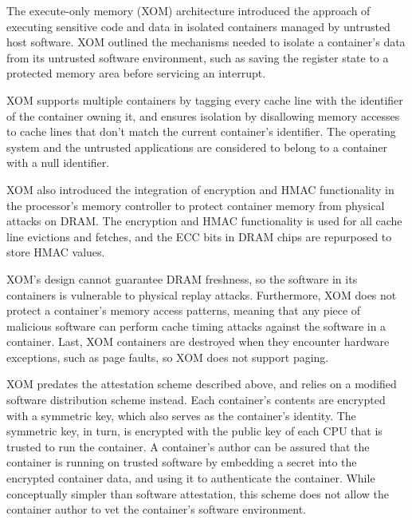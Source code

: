 \label{sec:sgx_related_xom}

The execute-only memory (XOM) architecture \cite{lie2000xom} introduced the
approach of executing sensitive code and data in isolated containers managed by
untrusted host software. XOM outlined the mechanisms needed to isolate a
container's data from its untrusted software environment, such as saving the
register state to a protected memory area before servicing an interrupt.

XOM supports multiple containers by tagging every cache line with the
identifier of the container owning it, and ensures isolation by disallowing
memory accesses to cache lines that don't match the current container's
identifier. The operating system and the untrusted applications are considered
to belong to a container with a null identifier.

XOM also introduced the integration of encryption and HMAC functionality in
the processor's memory controller to protect container memory from physical
attacks on DRAM. The encryption and HMAC functionality is used for all cache
line evictions and fetches, and the ECC bits in DRAM chips are repurposed to
store HMAC values.

XOM's design cannot guarantee DRAM freshness, so the software in its containers
is vulnerable to physical replay attacks. Furthermore, XOM does not protect a
container's memory access patterns, meaning that any piece of malicious
software can perform cache timing attacks against the software in a container.
Last, XOM containers are destroyed when they encounter hardware exceptions,
such as page faults, so XOM does not support paging.

XOM predates the attestation scheme described above, and relies on a modified
software distribution scheme instead. Each container's contents are encrypted
with a symmetric key, which also serves as the container's identity. The
symmetric key, in turn, is encrypted with the public key of each CPU that is
trusted to run the container. A container's author can be assured that the
container is running on trusted software by embedding a secret into the
encrypted container data, and using it to authenticate the container. While
conceptually simpler than software attestation, this scheme does not allow the
container author to vet the container's software environment.
